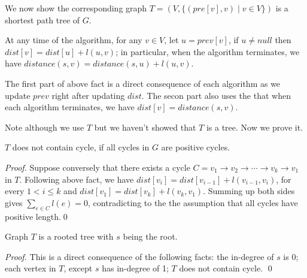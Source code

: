 \begin{minipage}{0.8\textwidth}
	\xxx
	\xxx
	\xxx
	\aab {\textcolor{blue}{$prev[v] = null$, for any $v\in V$};}\xxx
	\xxx
	\xxx
	\xxx
	\xxx
	\xxx
	\xxx
\end{minipage}

\begin{minipage}{0.8\textwidth}
	\xxx
	\xxx
	\xxx
	\aac {\textcolor{blue}{$prev[v]= u$};}\xxx
	\xxx
	\xxx
\end{minipage}


We now show the corresponding graph $T = (V, \{(pre[v], v)\mid v\in V\})$ is a shortest path tree of $G$.

\begin{fact}
\label{fact2}
At any time of the algorithm, for any $v\in V$, let $u = prev[v]$, if $u\neq null$ then $dist[v] = dist[u] + l(u,v)$;
in particular, when the algorithm terminates, we have $distance(s,v) = distance(s,u) + l(u,v)$.
\end{fact}
The first part of above fact is a direct consequence of each algorithm as we update $prev$ right after updating $dist$.
The secon part also uses the that when each algorithm terminates, we have $dist[v] = distance(s,v)$.

Note although we use $T$ but we haven't showed that $T$ is a tree.  Now we prove it. 
\begin{fact}
$T$ does not contain cycle, if all cycles in $G$ are positive cycles.
\end{fact}
\emph{Proof.} Suppose conversely that there exists a cycle $C = v_1\to v_2\to \cdots \to v_k\to v_1$ in $T$.
Following above fact, we have $dist[v_i] = dist[v_{i-1}] + l(v_{i-1},v_i)$, for every $1 < i \le k$
and $dist[v_1] = dist[v_k] + l(v_k,v_1)$.
Summing up both sides gives $\sum_{e\in C} l(e) = 0$, contradicting to the the assumption
that all cycles have positive length.\qed

\begin{fact}
Graph $T$ is a rooted tree with $s$ being the root.
\end{fact}
\emph{Proof.} This is a direct consequence of the following facts: the in-degree of $s$ is 0; each vertex in $T$, except $s$
has in-degree of 1; $T$ does not contain cycle. \qed

